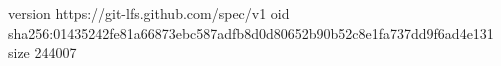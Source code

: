 version https://git-lfs.github.com/spec/v1
oid sha256:01435242fe81a66873ebc587adfb8d0d80652b90b52c8e1fa737dd9f6ad4e131
size 244007
